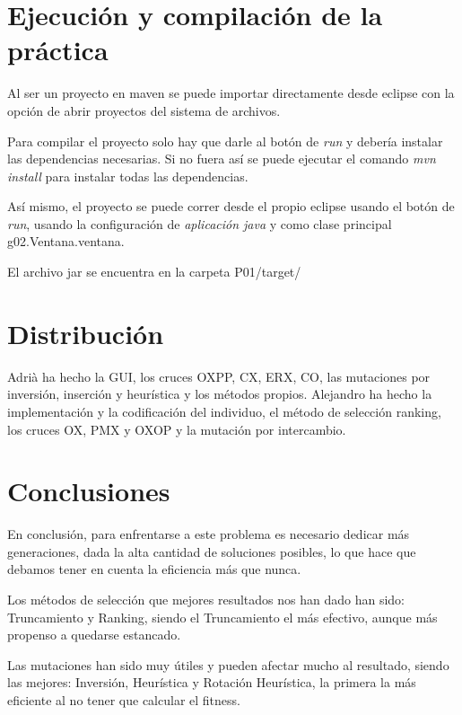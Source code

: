 \documentclass[twoside]{AiTeX}
\begin{document}
\section{Ejecución y compilación de la práctica}

Al ser un proyecto en maven se puede importar directamente desde eclipse con la opción de abrir proyectos del sistema de archivos.

Para compilar el proyecto solo hay que darle al botón de \textit{run} y debería instalar las dependencias necesarias. Si no fuera así se puede ejecutar el comando \textit{mvn install} para instalar todas las dependencias.

Así mismo, el proyecto se puede correr desde el propio eclipse usando el botón de \textit{run}, usando la configuración de \textit{aplicación java} y como clase principal g02.Ventana.ventana.

El archivo jar se encuentra en la carpeta P01/target/



\section{Distribución}

Adrià ha hecho la GUI, los cruces OXPP, CX, ERX, CO, las mutaciones por inversión, inserción y heurística y los métodos propios. Alejandro ha hecho la implementación y la codificación del individuo, el método de selección ranking, los cruces OX, PMX y OXOP y la mutación por intercambio.

\section{Conclusiones}

En conclusión, para enfrentarse a este problema es necesario dedicar más generaciones, dada la alta cantidad de soluciones posibles, lo que hace que debamos tener en cuenta la eficiencia más que nunca.

Los métodos de selección que mejores resultados nos han dado han sido: Truncamiento y Ranking, siendo el Truncamiento el más efectivo, aunque más propenso a quedarse estancado.

Las mutaciones han sido muy útiles y pueden afectar mucho al resultado, siendo las mejores: Inversión, Heurística y Rotación Heurística, la primera la más eficiente al no tener que calcular el fitness.
\end{document}
